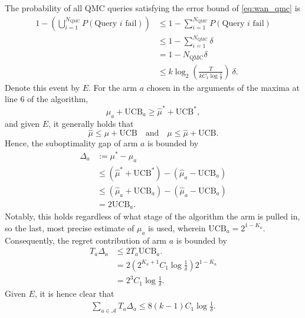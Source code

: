 The probability of all QMC queries satisfying the error bound of \cref{eq:wan_qmc} is
\begin{equation}
    \begin{aligned}
        1 - \left(\bigcup_{i = 1}^{N_{\text{QMC}}} P(\text{Query } i \text{ fail}) \right)
         & \leq
        1 - \sum_{i = 1}^{N_{\text{QMC}}} P(\text{Query } i \text{ fail})             \\
         & \leq
        1 - \sum_{i = 1}^{N_{\text{QMC}}} \delta                                      \\
         & =
        1 - N_{\text{QMC}} \delta                                                     \\
         & \leq k \log_2 \left(\frac{T}{k C_1 \log \frac{1}{\delta}}\right) \ \delta.
    \end{aligned}
\end{equation}
Denote this event by $E$.
For the arm $a$ chosen in the arguments of the maxima at line 6 of the algorithm,
\begin{equation}
    \hat\mu_a + \text{UCB}_a \geq \hat\mu^* + \text{UCB}^*,
\end{equation}
and given $E$, it generally holds that
\begin{equation}
    \hat\mu \leq \mu + \text{UCB}
    \quad \text{and} \quad
    \mu \leq \hat\mu + \text{UCB}.
\end{equation}
Hence, the suboptimality gap of arm $a$ is bounded by
\begin{equation}
    \begin{aligned}
        \Delta_a & := \mu^* - \mu_a                                             \\
                 & \leq (\hat\mu^* + \text{UCB}^*) - (\hat\mu_a - \text{UCB}_a) \\
                 & \leq (\hat\mu_a + \text{UCB}_a) - (\hat\mu_a - \text{UCB}_a) \\
                 & = 2 \text{UCB}_a.
    \end{aligned}
\end{equation}
Notably, this holds regardless of what stage of the algorithm the arm is pulled in, so the last, most precise estimate of $\mu_a$ is used, wherein $\text{UCB}_a = 2^{1 - K_a}$.
Consequently, the regret contribution of arm $a$ is bounded by
\begin{equation}
    \begin{aligned}
        T_a \Delta_a & \leq 2 T_a \text{UCB}_a.                            \\
                     & = 2 (2^{K_a + 1} C_1 \log \frac1\delta) 2^{1 - K_a} \\
                     & = 2^3 C_1 \log \frac1\delta.
    \end{aligned}
\end{equation}
Given $E$, it is hence clear that
\begin{equation}
    \begin{aligned}
        \sum_{a \in \mathcal{A}} T_a \Delta_a  \leq 8 (k-1) C_1 \log \frac1\delta.
    \end{aligned}
\end{equation}

